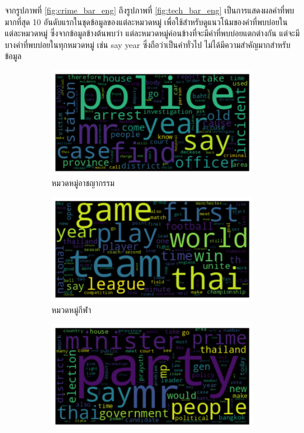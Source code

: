 \documentclass[12pt,oneside,openright,a4paper]{cpe-thai-project}
\begin{document}
        \hspace{1cm}จากรูปภาพที่ \ref{fig:crime_bar_eng} ถึงรูปภาพที่ \ref{fig:tech_bar_eng} เป็นการแสดงผลคำที่พบมากที่สุด 10 อันดับแรกในชุดข้อมูลของแต่ละหมวดหมู่
        เพื่อใช้สำหรับดูแนวโน้มของคำที่พบบ่อยในแต่ละหมวดหมู่ ซึ่งจากข้อมูลข้างต้นพบว่า แต่ละหมวดหมู่ค่อนข้างที่จะมีคำที่พบบ่อยแตกต่างกัน แต่จะมีบางคำที่พบบ่อยในทุกหมวดหมู่
        เช่น say year ซึ่งถือว่าเป็นคำทั่วไป ไม่ได้มีความสำคัญมากสำหรับข้อมูล 
        \newpage
        \begin{figure}[!ht]\centering
          \begin{subfigure}{0.49\textwidth}
            \includegraphics[width=\linewidth]{./img/eng_stat/crime_wc.png} 
            \caption{หมวดหมู่อาชญากรรม}
            \label{fig:subim_eng1}
          \end{subfigure}
          \begin{subfigure}{0.49\textwidth}
            \includegraphics[width=\linewidth]{./img/eng_stat/sport_wc.png}
            \caption{หมวดหมู่กีฬา}
            \label{fig:subim_eng2}
          \end{subfigure}
          \begin{subfigure}{0.49\textwidth}
            \includegraphics[width=\linewidth]{./img/eng_stat/polit_wc.png}

\end{subfigure}
\end{figure}
\end{document}
